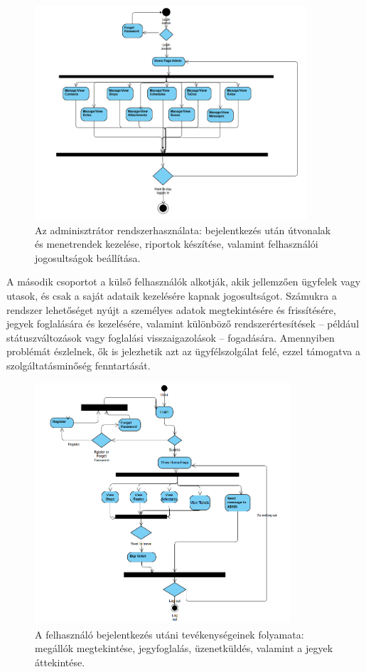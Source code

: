 \begin{figure}[h!]
    \centering
    \includegraphics[width=0.90\textwidth]{Szakdolgozat/Mellekletek/activityadmin.PNG}
    \caption{Az adminisztrátor rendszerhasználata: bejelentkezés után útvonalak és menetrendek kezelése, riportok készítése, valamint felhasználói jogosultságok beállítása.}
    \label{fig:admin-activity}
\end{figure}

A második csoportot a külső felhasználók alkotják, akik jellemzően ügyfelek vagy utasok, és csak a saját adataik kezelésére kapnak jogosultságot. Számukra a rendszer lehetőséget nyújt a személyes adatok megtekintésére és frissítésére, jegyek foglalására és kezelésére, valamint különböző rendszerértesítések – például státuszváltozások vagy foglalási visszaigazolások – fogadására. Amennyiben problémát észlelnek, ők is jelezhetik azt az ügyfélszolgálat felé, ezzel támogatva a szolgáltatásminőség fenntartását.

\begin{figure}[h!]
    \centering
    \includegraphics[width=0.85\textwidth]{Szakdolgozat/Mellekletek/activityuser.PNG}
    \caption{A felhasználó bejelentkezés utáni tevékenységeinek folyamata: megállók megtekintése, jegyfoglalás, üzenetküldés, valamint a jegyek áttekintése.}
    \label{fig:user-activity}
\end{figure}

